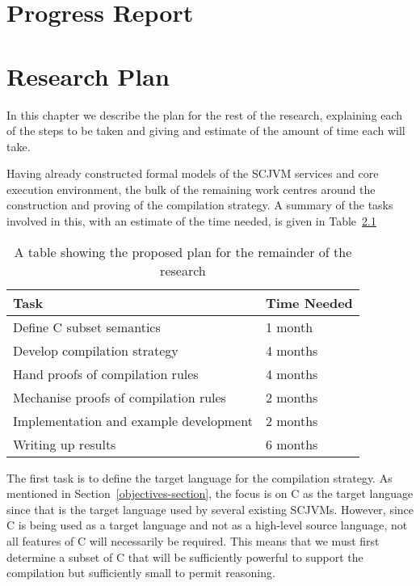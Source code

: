 \documentclass[a4paper,10pt]{report}
\begin{document}
\chapter{Progress Report}

\chapter{Research Plan}

In this chapter we describe the plan for the rest of the research,
explaining each of the steps to be taken and giving and estimate of
the amount of time each will take.

Having already constructed formal models of the SCJVM services and
core execution environment, the bulk of the remaining work centres
around the construction and proving of the compilation strategy.
A summary of the tasks involved in this, with an estimate of the time
needed, is given in Table~\ref{research-plan-table}

\begin{table}[ht]
  \centering
  \begin{tabular}{ll}
    \hline
    Task & Time Needed \\
    \hline
    Define C subset semantics & 1 month \\
    Develop compilation strategy & 4 months \\
    Hand proofs of compilation rules & 4 months \\
    Mechanise proofs of compilation rules & 2 months \\
    Implementation and example development & 2 months \\
    Writing up results & 6 months \\
    \hline
  \end{tabular}
  \caption{A table showing the proposed plan for the remainder of the research}
  \label{research-plan-table}
\end{table}

The first task is to define the target language for the compilation
strategy.
As mentioned in Section~\ref{objectives-section}, the focus is on C as
the target language since that is the target language used by several
existing SCJVMs.
However, since C is being used as a target language and not as a
high-level source language, not all features of C will necessarily be
required.
This means that we must first determine a subset of C that will be
sufficiently powerful to support the compilation but sufficiently
small to permit reasoning.
\end{document}
